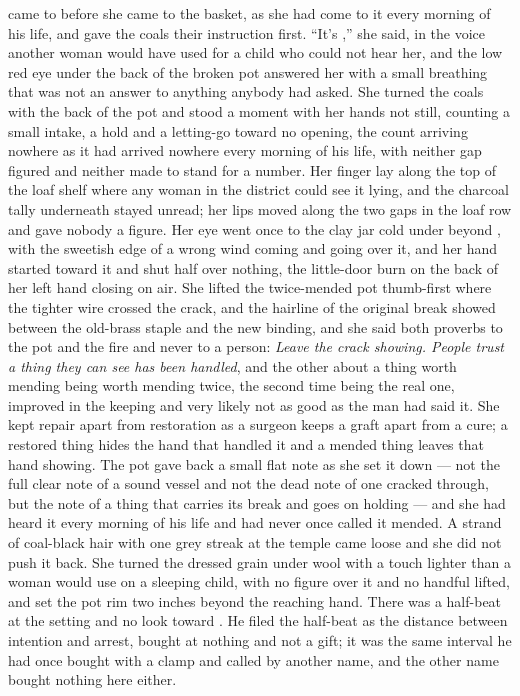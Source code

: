  came to  before she came to the basket, as she had come to it every morning of his life, and gave the coals their instruction first. “It's ,” she said, in the voice another woman would have used for a child who could not hear her, and the low red eye under the back of the broken pot answered her with a small breathing that was not an answer to anything anybody had asked. She turned the coals with the back of the pot and stood a moment with her hands not still, counting a small intake, a hold and a letting-go toward no opening, the count arriving nowhere as it had arrived nowhere every morning of his life, with neither gap figured and neither made to stand for a number. Her finger lay along the top of the loaf shelf where any woman in the district could see it lying, and the charcoal tally underneath stayed unread; her lips moved along the two gaps in the loaf row and gave nobody a figure. Her eye went once to the clay jar cold under  beyond , with the sweetish edge of a wrong wind coming and going over it, and her hand started toward it and shut half over nothing, the little-door burn on the back of her left hand closing on air. She lifted the twice-mended pot thumb-first where the tighter wire crossed the crack, and the hairline of the original break showed between the old-brass staple and the new binding, and she said both proverbs to the pot and the fire and never to a person: \emph{Leave the crack showing. People trust a thing they can see has been handled}, and the other about a thing worth mending being worth mending twice, the second time being the real one, improved in the keeping and very likely not as good as the man had said it. She kept repair apart from restoration as a surgeon keeps a graft apart from a cure; a restored thing hides the hand that handled it and a mended thing leaves that hand showing. The pot gave back a small flat note as she set it down --- not the full clear note of a sound vessel and not the dead note of one cracked through, but the note of a thing that carries its break and goes on holding --- and she had heard it every morning of his life and had never once called it mended. A strand of coal-black hair with one grey streak at the temple came loose and she did not push it back. She turned the dressed grain under wool with a touch lighter than a woman would use on a sleeping child, with no figure over it and no handful lifted, and set the pot rim two inches beyond the reaching hand. There was a half-beat at the setting and no look toward . He filed the half-beat as the distance between intention and arrest, bought at nothing and not a gift; it was the same interval he had once bought with a clamp and called by another name, and the other name bought nothing here either.

